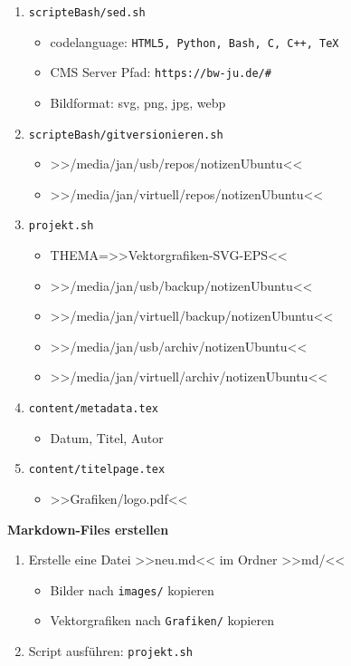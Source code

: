 \begin{enumerate}
\item
  \verb|scripteBash/sed.sh|

  \begin{itemize}
  \item
    codelanguage:
    \verb|HTML5, Python, Bash, C, C++, TeX|
  \item
    CMS Server Pfad: \verb|https://bw-ju.de/#|
  \item
    Bildformat: svg, png, jpg, webp
  \end{itemize}
\item
  \verb|scripteBash/gitversionieren.sh|

  \begin{itemize}
  \item
    >>/media/jan/usb/repos/notizenUbuntu<<
  \item
    >>/media/jan/virtuell/repos/notizenUbuntu<<
  \end{itemize}
\item
  \verb|projekt.sh|

  \begin{itemize}
  \item
    THEMA=>>Vektorgrafiken-SVG-EPS<<
  \item
    >>/media/jan/usb/backup/notizenUbuntu<<
  \item
    >>/media/jan/virtuell/backup/notizenUbuntu<<
  \item
    >>/media/jan/usb/archiv/notizenUbuntu<<
  \item
    >>/media/jan/virtuell/archiv/notizenUbuntu<<
  \end{itemize}
\item
  \verb|content/metadata.tex|

  \begin{itemize}
  \item
    Datum, Titel, Autor
  \end{itemize}
\item
  \verb|content/titelpage.tex|

  \begin{itemize}
  \item
    >>Grafiken/logo.pdf<<
  \end{itemize}
\end{enumerate}

\textbf{Markdown-Files erstellen}

\begin{enumerate}
\item
  Erstelle eine Datei >>neu.md<< im Ordner >>md/<<

  \begin{itemize}
  \item
    Bilder nach \verb|images/| kopieren
  \item
    Vektorgrafiken nach \verb|Grafiken/| kopieren
  \end{itemize}
\item
  Script ausführen: \verb|projekt.sh|
\end{enumerate}

